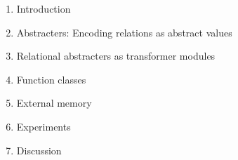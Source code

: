 \begin{enumerate}
    \item Introduction
    \item Abstracters: Encoding relations as abstract values
    \item Relational abstracters as transformer modules
    \item Function classes 
    \item External memory 
    \item Experiments
    \item Discussion
\end{enumerate}
